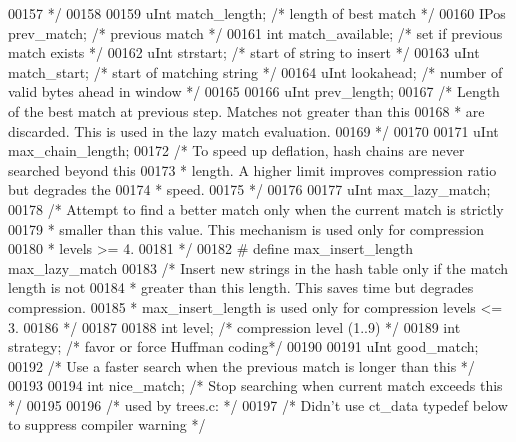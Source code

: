 \begin{DoxyCode}
00157 \textcolor{comment}{     */}
00158 
00159     uInt match\_length;           \textcolor{comment}{/* length of best match */}
00160     IPos prev\_match;             \textcolor{comment}{/* previous match */}
00161     \textcolor{keywordtype}{int} match\_available;         \textcolor{comment}{/* set if previous match exists */}
00162     uInt strstart;               \textcolor{comment}{/* start of string to insert */}
00163     uInt match\_start;            \textcolor{comment}{/* start of matching string */}
00164     uInt lookahead;              \textcolor{comment}{/* number of valid bytes ahead in window */}
00165 
00166     uInt prev\_length;
00167     \textcolor{comment}{/* Length of the best match at previous step. Matches not greater than this}
00168 \textcolor{comment}{     * are discarded. This is used in the lazy match evaluation.}
00169 \textcolor{comment}{     */}
00170 
00171     uInt max\_chain\_length;
00172     \textcolor{comment}{/* To speed up deflation, hash chains are never searched beyond this}
00173 \textcolor{comment}{     * length.  A higher limit improves compression ratio but degrades the}
00174 \textcolor{comment}{     * speed.}
00175 \textcolor{comment}{     */}
00176 
00177     uInt max\_lazy\_match;
00178     \textcolor{comment}{/* Attempt to find a better match only when the current match is strictly}
00179 \textcolor{comment}{     * smaller than this value. This mechanism is used only for compression}
00180 \textcolor{comment}{     * levels >= 4.}
00181 \textcolor{comment}{     */}
00182 \textcolor{preprocessor}{#   define max\_insert\_length  max\_lazy\_match}
00183     \textcolor{comment}{/* Insert new strings in the hash table only if the match length is not}
00184 \textcolor{comment}{     * greater than this length. This saves time but degrades compression.}
00185 \textcolor{comment}{     * max\_insert\_length is used only for compression levels <= 3.}
00186 \textcolor{comment}{     */}
00187 
00188     \textcolor{keywordtype}{int} level;    \textcolor{comment}{/* compression level (1..9) */}
00189     \textcolor{keywordtype}{int} strategy; \textcolor{comment}{/* favor or force Huffman coding*/}
00190 
00191     uInt good\_match;
00192     \textcolor{comment}{/* Use a faster search when the previous match is longer than this */}
00193 
00194     \textcolor{keywordtype}{int} nice\_match; \textcolor{comment}{/* Stop searching when current match exceeds this */}
00195 
00196                 \textcolor{comment}{/* used by trees.c: */}
00197     \textcolor{comment}{/* Didn't use ct\_data typedef below to suppress compiler warning */}

\end{DoxyCode}
